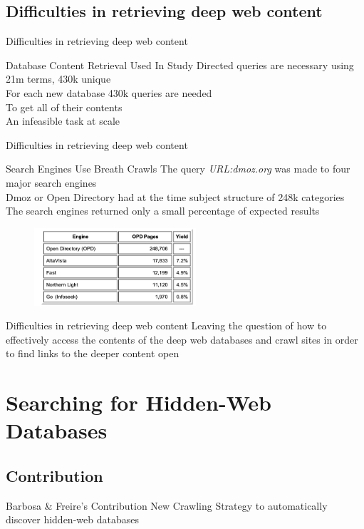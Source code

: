 \documentclass{beamer}
\begin{document}
\subsection{Difficulties in retrieving deep web content }
\begin{frame}[fragile]{Difficulties in retrieving deep web content }
\begin{block}{Database Content Retrieval Used In Study}
Directed queries are necessary 
using 21m terms, 430k unique \\
For each new database 430k queries are needed \\
To get all of their contents \\
An infeasible task at scale
\end{block}

\end{frame}
\begin{frame}[fragile]{Difficulties in retrieving deep web content }
\begin{block}{Search Engines Use Breath Crawls}
The query  \emph{URL:dmoz.org} was made to four major search engines \\
Dmoz or Open Directory had at the time subject structure of 248k categories \\
The search engines returned only a small percentage of expected results
\end{block}
\begin{figure}
			\includegraphics[width=6cm]{dwII.png}
		\end{figure}
\end{frame}
\begin{frame}[fragile]{Difficulties in retrieving deep web content }
Leaving the question of how to effectively access the contents of the deep 
web databases and crawl sites in order to find links to the deeper content open
\end{frame}
\section{Searching for Hidden-Web Databases}
\subsection{Contribution}
\begin{frame}{ Barbosa \&  Freire's Contribution}
New Crawling Strategy to automatically discover hidden-web databases
\end{frame}
\end{document}
